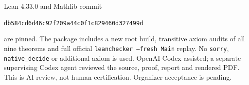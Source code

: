 \documentclass[11pt]{article}
\begin{document}
Lean 4.33.0 and Mathlib commit
\begin{center}\small\texttt{db584cd6d46c92f209a44c0f1c829460d327499d}\end{center}
are pinned. The package includes a new root build, transitive
axiom audits of all nine theorems and full official
\texttt{leanchecker --fresh Main} replay. No \texttt{sorry},
\texttt{native\_decide} or additional axiom is used.
OpenAI Codex assisted; a separate supervising Codex agent reviewed
the source, proof, report and rendered PDF. This is AI review,
not human certification. Organizer acceptance is pending.
\end{document}
